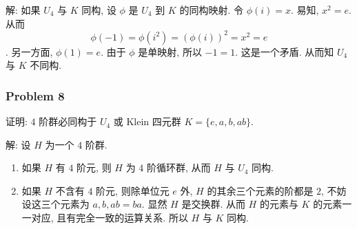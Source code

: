 \documentclass[a4paper,12pt]{ctexart}
\begin{document}
  解: 如果 $U_4$ 与 $K$ 同构, 设 $\phi$ 是 $U_4$ 到 $K$ 的同构映射. 令
  $\phi(i) = x$. 易知, $x^2 = e$. 从而
  \[\phi(−1) = \phi(i^2) = (\phi(i))^2 = x^2 = e\].
  另一方面, $\phi(1) = e$. 由于 $\phi$ 是单映射, 所以 $−1 = 1$. 这是一个矛盾. 从而知 $U_4$ 与 $K$ 不同构.
  
  \subsubsection*{Problem 8}
  证明: $4$ 阶群必同构于 $U_4$ 或 Klein 四元群 $K=\{e, a, b, a b\}$.

  解: 设 $H$ 为一个 $4$ 阶群.
  \begin{enumerate}[label=(\arabic{*})]
    \item 如果 $H$ 有 $4$ 阶元, 则 $H$ 为 $4$ 阶循环群, 从而 $H$ 与 $U_4$ 同构.
    \item 如果 $H$ 不含有 $4$ 阶元, 则除单位元 $e$ 外, $H$ 的其余三个元素的阶都是 $2$, 不妨设这三个元素为 $a,b,ab = ba$. 
    显然 $H$ 是交换群. 从而 $H$ 的元素与 $K$ 的元素一一对应, 且有完全一致的运算关系. 所以 $H$ 与 $K$ 同构.
  \end{enumerate}
\end{document}
